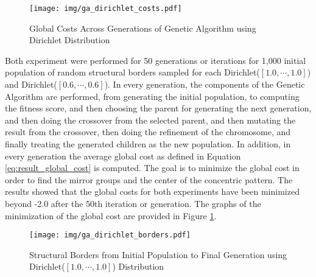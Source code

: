 \begin{figure}[!t]
    \centering
    \texttt{[image: img/ga\_dirichlet\_costs.pdf]}
    \caption{Global Costs Across Generations of Genetic Algorithm using Dirichlet Distribution}
    \label{fig:result_ga_dirichlet_cost}
\end{figure}

Both experiment were performed for 50 generations or iterations for 1,000 initial population of random structural borders sampled for each Dirichlet($[1.0,\cdots,1.0]$) and Dirichlet($[0.6,\cdots,0.6]$). In every generation, the components of the Genetic Algorithm are performed, from generating the initial population, to computing the fitness score, and then choosing the parent for generating the next generation, and then doing the crossover from the selected parent, and then mutating the result from the crossover, then doing the refinement of the chromosome, and finally treating the generated children as the new population. In addition, in every generation the average global cost as defined in Equation \ref{eq:result_global_cost} is computed. The goal is to minimize the global cost in order to find the mirror groups and the center of the concentric pattern. The results showed that the global costs for both experiments have been minimized beyond -2.0 after the 50th iteration or generation. The graphs of the minimization of the global cost are provided in Figure \ref{fig:result_ga_dirichlet_cost}.

\begin{figure}[!t]
    \centering
    \texttt{[image: img/ga\_dirichlet\_borders.pdf]}
    \caption{Structural Borders from Initial Population to Final Generation using Dirichlet($[1.0,\cdots,1.0]$) Distribution}
    \label{fig:result_ga_first_final_borders}
\end{figure}

